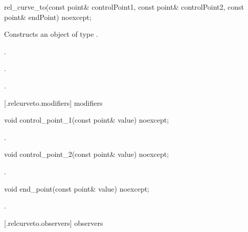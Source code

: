 \begin{itemdecl}
    rel_curve_to(const point& controlPoint1, const point& controlPoint2,
      const point& endPoint) noexcept;
\end{itemdecl}
\begin{itemdescr}
	\pnum
	\effects
	Constructs an object of type .
	
	\pnum
	\postconditions
	.

	.

	.

\end{itemdescr}

 [\iotwod.relcurveto.modifiers]{ modifiers}

\begin{itemdecl}
    void control_point_1(const point& value) noexcept;
\end{itemdecl}
\begin{itemdescr}
	\pnum
	\postconditions
	.
	
\end{itemdescr}

\begin{itemdecl}
    void control_point_2(const point& value) noexcept;
\end{itemdecl}
\begin{itemdescr}
	\pnum
	\postconditions
	.
	
\end{itemdescr}

\begin{itemdecl}
    void end_point(const point& value) noexcept;
\end{itemdecl}
\begin{itemdescr}
	\pnum
	\postconditions
	.
	
\end{itemdescr}

 [\iotwod.relcurveto.observers]{ observers}

